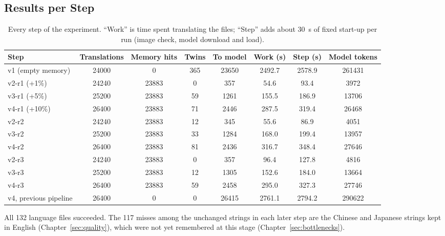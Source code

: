 \subsection{Results per Step}
\begin{table}[H]
\centering
\caption[Every step of the memory experiment]{Every step of the experiment. ``Work'' is time spent translating the files;
``Step'' adds about 30~s of fixed start-up per run (image check, model download and load).}
\label{tab:tmsteps}
\small\setlength{\tabcolsep}{4pt}
\begin{tabular}{@{}l S[table-format=5.0] S[table-format=5.0] S[table-format=3.0] S[table-format=5.0] S[table-format=4.1] S[table-format=4.1] S[table-format=6.0]@{}}
\toprule
\textbf{Step} & {\textbf{Translations}} & {\textbf{Memory hits}} & {\textbf{Twins}} & {\textbf{To model}} & {\textbf{Work (s)}} & {\textbf{Step (s)}} & {\textbf{Model tokens}} \\
\midrule
v1 (empty memory) & 24000 & 0 & 365 & 23650 & 2492.7 & 2578.9 & 261431 \\
v2-r1 (+1\%) & 24240 & 23883 & 0 & 357 & 54.6 & 93.4 & 3972 \\
v3-r1 (+5\%) & 25200 & 23883 & 59 & 1261 & 155.5 & 186.9 & 13706 \\
v4-r1 (+10\%) & 26400 & 23883 & 71 & 2446 & 287.5 & 319.4 & 26468 \\
v2-r2 & 24240 & 23883 & 12 & 345 & 55.6 & 86.9 & 4051 \\
v3-r2 & 25200 & 23883 & 33 & 1284 & 168.0 & 199.4 & 13957 \\
v4-r2 & 26400 & 23883 & 81 & 2436 & 316.7 & 348.4 & 27646 \\
v2-r3 & 24240 & 23883 & 0 & 357 & 96.4 & 127.8 & 4816 \\
v3-r3 & 25200 & 23883 & 12 & 1305 & 152.6 & 184.0 & 13664 \\
v4-r3 & 26400 & 23883 & 59 & 2458 & 295.0 & 327.3 & 27746 \\
\midrule
v4, previous pipeline & 26400 & 0 & 0 & 26415 & 2761.1 & 2794.2 & 290622 \\
\bottomrule
\end{tabular}
\end{table}

All 132 language files succeeded. The 117 misses among the unchanged strings in each later step are the Chinese and
Japanese strings kept in English (Chapter~\ref{sec:quality}), which were not yet remembered at this stage
(Chapter~\ref{sec:bottlenecks}).

